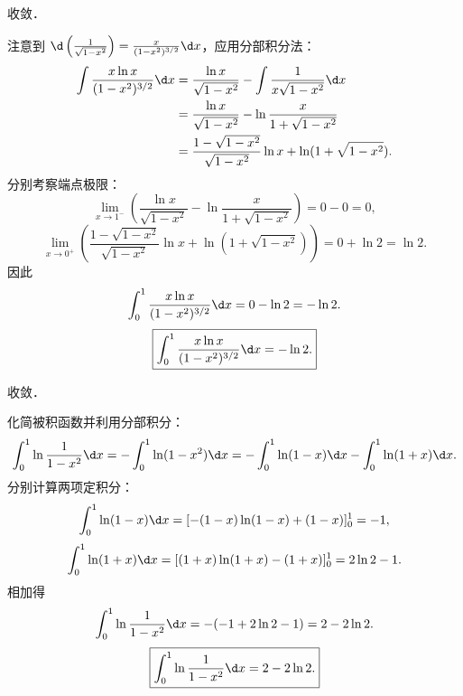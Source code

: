 \begin{solution}
     收敛．

    注意到 $\d\left( \frac{1}{\sqrt{1 - x^2}} \right) = \frac{x}{(1 - x^2)^{3/2}} \d x$，应用分部积分法：
    \begin{equation}
        \begin{aligned}
            \int \frac{x\ln x}{(1 - x^2)^{3/2}} \d x & = \frac{\ln x}{\sqrt{1 - x^2}} - \int \frac{1}{x\sqrt{1 - x^2}} \d x        \\
                                                     & = \frac{\ln x}{\sqrt{1 - x^2}} - \ln\frac{x}{1 + \sqrt{1 - x^2}}            \\
                                                     & = \frac{1 - \sqrt{1 - x^2}}{\sqrt{1 - x^2}}\ln x + \ln(1 + \sqrt{1 - x^2}).
        \end{aligned}
    \end{equation}
    分别考察端点极限：
    \begin{equation}
        \lim_{x\to 1^-} \left( \frac{\ln x}{\sqrt{1 - x^2}} - \ln\frac{x}{1 + \sqrt{1 - x^2}} \right) = 0 - 0 = 0,
    \end{equation}
    \begin{equation}
        \lim_{x\to 0^+} \left( \frac{1 - \sqrt{1 - x^2}}{\sqrt{1 - x^2}}\ln x + \ln(1 + \sqrt{1 - x^2}) \right) = 0 + \ln 2 = \ln 2.
    \end{equation}
    因此
    \begin{equation}
        \int_0^1 \frac{x \ln x}{(1 - x^2)^{3/2}} \d x = 0 - \ln 2 = -\ln 2.
    \end{equation}
    \begin{equation}
        \boxed{\int_0^1 \frac{x \ln x}{(1 - x^2)^{3/2}} \d x = -\ln 2.}
    \end{equation}

     收敛．

    化简被积函数并利用分部积分：
    \begin{equation}
        \int_0^1 \ln\frac{1}{1 - x^2} \d x = -\int_0^1 \ln(1 - x^2) \d x = -\int_0^1 \ln(1 - x) \d x - \int_0^1 \ln(1 + x) \d x.
    \end{equation}
    分别计算两项定积分：
    \begin{equation}
        \int_0^1 \ln(1 - x) \d x = [-(1 - x)\ln(1 - x) + (1 - x)]_0^1 = -1,
    \end{equation}
    \begin{equation}
        \int_0^1 \ln(1 + x) \d x = [(1 + x)\ln(1 + x) - (1 + x)]_0^1 = 2\ln 2 - 1.
    \end{equation}
    相加得
    \begin{equation}
        \int_0^1 \ln\frac{1}{1 - x^2} \d x = -(-1 + 2\ln 2 - 1) = 2 - 2\ln 2.
    \end{equation}
    \begin{equation}
        \boxed{\int_0^1 \ln \frac{1}{1 - x^2} \d x = 2 - 2\ln 2.}
    \end{equation}


\end{solution}
